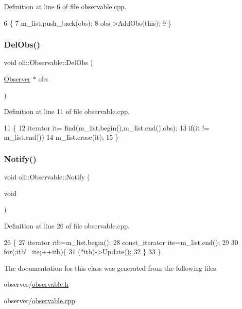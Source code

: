 Definition at line 6 of file observable.\+cpp.


\begin{DoxyCode}
6                                      \{
7     m\_list.push\_back(obs);
8     obs->AddObs(\textcolor{keyword}{this});
9 \}
\end{DoxyCode}
\hypertarget{classoli_1_1_observable_a9fb13016d9b81c1132171b581e243d8b}{}\label{classoli_1_1_observable_a9fb13016d9b81c1132171b581e243d8b} 
\subsubsection{\texorpdfstring{Del\+Obs()}{DelObs()}}
{\footnotesize\ttfamily void oli\+::\+Observable\+::\+Del\+Obs (\begin{DoxyParamCaption}\item[{\hyperlink{classoli_1_1_observer}{Observer} $\ast$}]{obs }\end{DoxyParamCaption})}



Definition at line 11 of file observable.\+cpp.


\begin{DoxyCode}
11                                     \{
12     iterator it= find(m\_list.begin(),m\_list.end(),obs);
13     \textcolor{keywordflow}{if}(it != m\_list.end())
14         m\_list.erase(it);
15 \}
\end{DoxyCode}
\hypertarget{classoli_1_1_observable_ab1fe0a40f7aaa9d9acee97f8c08ec328}{}\label{classoli_1_1_observable_ab1fe0a40f7aaa9d9acee97f8c08ec328} 
\subsubsection{\texorpdfstring{Notify()}{Notify()}}
{\footnotesize\ttfamily void oli\+::\+Observable\+::\+Notify (\begin{DoxyParamCaption}\item[{void}]{ }\end{DoxyParamCaption})}



Definition at line 26 of file observable.\+cpp.


\begin{DoxyCode}
26                            \{
27     iterator itb=m\_list.begin();
28     const\_iterator ite=m\_list.end();
29 
30     \textcolor{keywordflow}{for}(;itb!=ite;++itb)\{
31         (*itb)->Update();
32     \}
33 \}
\end{DoxyCode}


The documentation for this class was generated from the following files\+:\begin{DoxyCompactItemize}
\item 
observer/\hyperlink{observable_8h}{observable.\+h}\item 
observer/\hyperlink{observable_8cpp}{observable.\+cpp}\end{DoxyCompactItemize}
